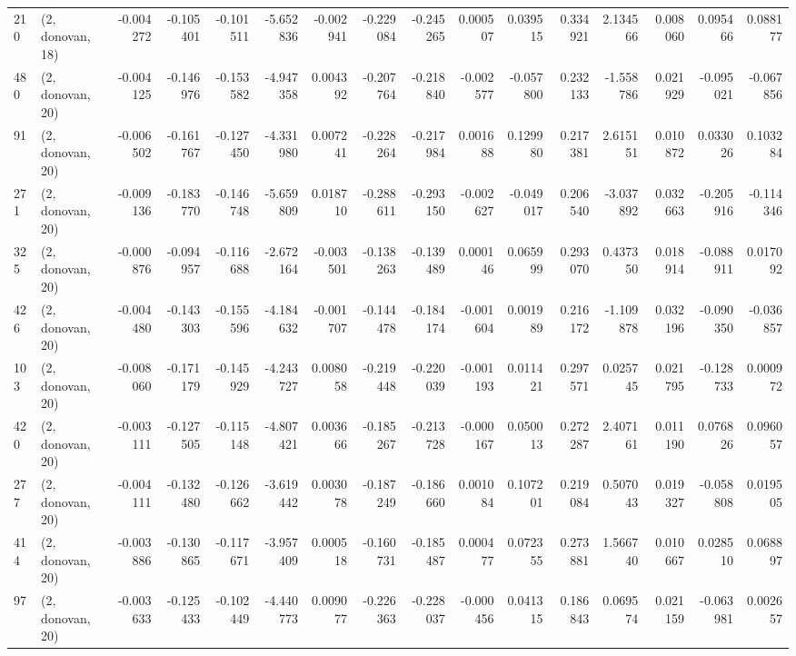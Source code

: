 \begin{tabular}{llrrrrrrrrrrrrrr}
210 &  (2, donovan, 18) &  -0.004272 & -0.105401 & -0.101511 &   -5.652836 & -0.002941 &  -0.229084 & -0.245265 &  0.000507 &  0.039515 &  0.334921 &    2.134566 &  0.008060 &  0.095466 &  0.088177 \\
480 &  (2, donovan, 20) &  -0.004125 & -0.146976 & -0.153582 &   -4.947358 &  0.004392 &  -0.207764 & -0.218840 & -0.002577 & -0.057800 &  0.232133 &   -1.558786 &  0.021929 & -0.095021 & -0.067856 \\
91  &  (2, donovan, 20) &  -0.006502 & -0.161767 & -0.127450 &   -4.331980 &  0.007241 &  -0.228264 & -0.217984 &  0.001688 &  0.129980 &  0.217381 &    2.615151 &  0.010872 &  0.033026 &  0.103284 \\
271 &  (2, donovan, 20) &  -0.009136 & -0.183770 & -0.146748 &   -5.659809 &  0.018710 &  -0.288611 & -0.293150 & -0.002627 & -0.049017 &  0.206540 &   -3.037892 &  0.032663 & -0.205916 & -0.114346 \\
325 &  (2, donovan, 20) &  -0.000876 & -0.094957 & -0.116688 &   -2.672164 & -0.003501 &  -0.138263 & -0.139489 &  0.000146 &  0.065999 &  0.293070 &    0.437350 &  0.018914 & -0.088911 &  0.017092 \\
426 &  (2, donovan, 20) &  -0.004480 & -0.143303 & -0.155596 &   -4.184632 & -0.001707 &  -0.144478 & -0.184174 & -0.001604 &  0.001989 &  0.216172 &   -1.109878 &  0.032196 & -0.090350 & -0.036857 \\
103 &  (2, donovan, 20) &  -0.008060 & -0.171179 & -0.145929 &   -4.243727 &  0.008058 &  -0.219448 & -0.220039 & -0.001193 &  0.011421 &  0.297571 &    0.025745 &  0.021795 & -0.128733 &  0.000972 \\
420 &  (2, donovan, 20) &  -0.003111 & -0.127505 & -0.115148 &   -4.807421 &  0.003666 &  -0.185267 & -0.213728 & -0.000167 &  0.050013 &  0.272287 &    2.407161 &  0.011190 &  0.076826 &  0.096057 \\
277 &  (2, donovan, 20) &  -0.004111 & -0.132480 & -0.126662 &   -3.619442 &  0.003078 &  -0.187249 & -0.186660 &  0.001084 &  0.107201 &  0.219084 &    0.507043 &  0.019327 & -0.058808 &  0.019505 \\
414 &  (2, donovan, 20) &  -0.003886 & -0.130865 & -0.117671 &   -3.957409 &  0.000518 &  -0.160731 & -0.185487 &  0.000477 &  0.072355 &  0.273881 &    1.566740 &  0.010667 &  0.028510 &  0.068897 \\
97  &  (2, donovan, 20) &  -0.003633 & -0.125433 & -0.102449 &   -4.440773 &  0.009077 &  -0.226363 & -0.228037 & -0.000456 &  0.041315 &  0.186843 &    0.069574 &  0.021159 & -0.063981 &  0.002657 \\

\end{tabular}
